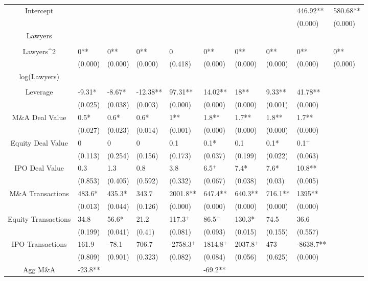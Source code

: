 \documentclass{article}
\begin{document}
\begin{table}[H]
\begin{tabular}{|clllllllll|}
Intercept &  &  &  &  &  &  &  & 446.92** & 580.68** \\ 
   &  &  &  &  &  &  &  & (0.000) & (0.000) \\ 
  Lawyers &  &  &  &  &  &  &  &  &  \\ 
   &  &  &  &  &  &  &  &  &  \\ 
  Lawyers^2 & 0** & 0** & 0** & 0 & 0** & 0** & 0** & 0** & 0** \\ 
   & (0.000) & (0.000) & (0.000) & (0.418) & (0.000) & (0.000) & (0.000) & (0.000) & (0.000) \\ 
  log(Lawyers) &  &  &  &  &  &  &  &  &  \\ 
   &  &  &  &  &  &  &  &  &  \\ 
  Leverage & -9.31* & -8.67* & -12.38** & 97.31** & 14.02** & 18** & 9.33** & 41.78** &  \\ 
   & (0.025) & (0.038) & (0.003) & (0.000) & (0.000) & (0.000) & (0.001) & (0.000) &  \\ 
  M\&A Deal Value & 0.5* & 0.6* & 0.6* & 1** & 1.8** & 1.7** & 1.8** & 1.7** &  \\ 
   & (0.027) & (0.023) & (0.014) & (0.001) & (0.000) & (0.000) & (0.000) & (0.000) &  \\ 
  Equity Deal Value & 0 & 0 & 0 & 0.1 & 0.1* & 0.1 & 0.1* & 0.1$^{+}$ &  \\ 
   & (0.113) & (0.254) & (0.156) & (0.173) & (0.037) & (0.199) & (0.022) & (0.063) &  \\ 
  IPO Deal Value & 0.3 & 1.3 & 0.8 & 3.8 & 6.5$^{+}$ & 7.4* & 7.6* & 10.8** &  \\ 
   & (0.853) & (0.405) & (0.592) & (0.332) & (0.067) & (0.038) & (0.03) & (0.005) &  \\ 
  M\&A Transactions & 483.6* & 435.3* & 343.7 & 2001.8** & 647.4** & 640.3** & 716.1** & 1395** &  \\ 
   & (0.013) & (0.044) & (0.126) & (0.000) & (0.000) & (0.000) & (0.000) & (0.000) &  \\ 
  Equity Transactions & 34.8 & 56.6* & 21.2 & 117.3$^{+}$ & 86.5$^{+}$ & 130.3* & 74.5 & 36.6 &  \\ 
   & (0.199) & (0.041) & (0.41) & (0.081) & (0.093) & (0.015) & (0.155) & (0.557) &  \\ 
  IPO Transactions & 161.9 & -78.1 & 706.7 & -2758.3$^{+}$ & 1814.8$^{+}$ & 2037.8$^{+}$ & 473 & -8638.7** &  \\ 
   & (0.809) & (0.901) & (0.323) & (0.082) & (0.084) & (0.056) & (0.625) & (0.000) &  \\ 
  Agg M\&A & -23.8** &  &  &  & -69.2** &  &  &  &  \\ 

\end{tabular}
\end{table}
\end{document}

